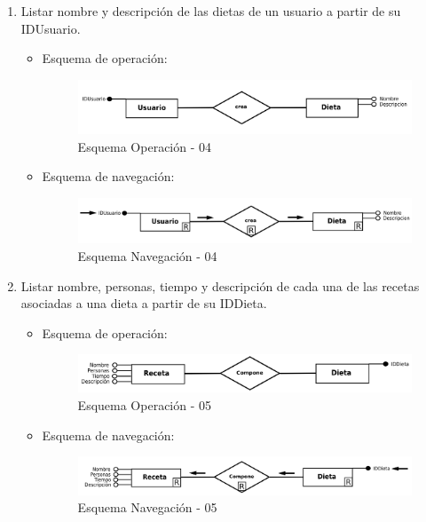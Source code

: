 \documentclass[a4paper,12pt]{report}
\begin{document}
\begin{enumerate}
\item Listar nombre y descripción de las dietas de un usuario a
partir de su IDUsuario.
\begin{itemize}
\item Esquema de operación:
\begin{figure}[!htp]
\centering
\includegraphics[width=0.9\linewidth]{./operaciones/img/Dietas/04_ope.png}
\caption{Esquema Operación - 04}
\label{fig:ope04}
\medskip
\footnotesize
{}
\end{figure}
\item Esquema de navegación:
\begin{figure}[!htp]
\centering
\includegraphics[width=0.9\linewidth]{./operaciones/img/Dietas/04_nav.png}
\caption{Esquema Navegación - 04}
\label{fig:nave04}
\medskip
\footnotesize
{}
\end{figure}
\end{itemize}

\item Listar nombre, personas, tiempo y descripción de cada una de
las recetas asociadas a una dieta a partir de su IDDieta.
\begin{itemize}
\item Esquema de operación:
\begin{figure}[!htp]
\centering
\includegraphics[width=0.9\linewidth]{./operaciones/img/Dietas/05_ope.png}
\caption{Esquema Operación - 05}
\label{fig:ope05}
\medskip
\footnotesize
{}
\end{figure}
\item Esquema de navegación:
\begin{figure}[!htp]
\centering
\includegraphics[width=0.9\linewidth]{./operaciones/img/Dietas/05_nav.png}
\caption{Esquema Navegación - 05}
\label{fig:nave05}
\medskip
\footnotesize
{}
\end{figure}
\end{itemize}


\end{enumerate}
\end{document}
